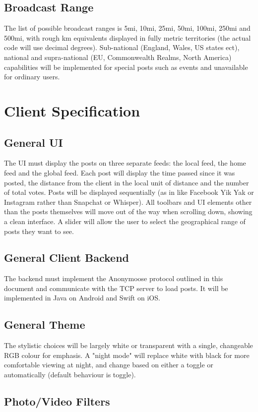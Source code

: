\documentclass[12pt, a4paper]{article}
\begin{document}
\subsection{Broadcast Range}
The list of possible broadcast ranges is 5mi, 10mi, 25mi, 50mi, 100mi, 250mi and 500mi, with rough km equivalents displayed in fully metric territories (the actual code will use decimal degrees). Sub-national (England, Wales, US states ect), national and supra-national (EU, Commonwealth Realms, North America) capabilities will be implemented for special posts such as events and unavailable for ordinary users.  
\section{Client Specification}
\subsection{General UI}
The UI must display the posts on three separate feeds: the local feed, the home feed and the global feed. Each post will display the time passed since it was posted, the distance from the client in the local unit of distance and the number of total votes. Posts will be displayed sequentially (as in like Facebook Yik Yak or Instagram rather than Snapchat or Whisper). All toolbars and UI elements other than the posts themselves will move out of the way when scrolling down, showing a clean interface. A slider will allow the user to select the geographical range of posts they want to see.
\subsection{General Client Backend}
The backend must implement the Anonymoose protocol outlined in this document and communicate with the TCP server to load posts. It will be implemented in Java on Android and Swift on iOS.
\subsection{General Theme}
The stylistic choices will be largely white or transparent with a single, changeable RGB colour for emphasis. A "night mode" will replace white with black for more comfortable viewing at night, and change based on either a toggle or automatically (default behaviour is toggle).
\subsection{Photo/Video Filters}
\end{document}
